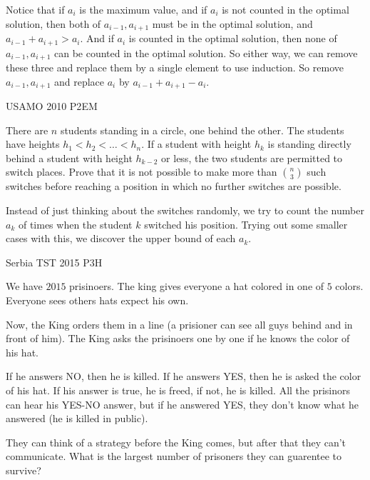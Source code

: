 \begin{solution}
    Notice that if $ a_i $ is the maximum value, and if $ a_i $ is not
    counted in the optimal solution, then both of $ a_{i-1}, a_{i+1} $ must be in
    the optimal solution, and $ a_{i-1} + a_{i+1} > a_i $. And if $ a_i $ is
    counted in the optimal solution, then none of $ a_{i-1}, a_{i+1} $ can be
    counted in the optimal solution. So either way, we can remove these three and
    replace them by a single element to use induction. So remove $ a_{i-1},
    a_{i+1} $ and replace $ a_i $ by $ a_{i-1} + a_{i+1} - a_i $.
\end{solution}


{USAMO 2010 P2}{EM}{
    There are $n$ students standing in a circle, one behind the other. The
    students have heights $h_1<h_2<\dots <h_n$. If a student with height $h_k$ is
    standing directly behind a student with height $h_{k-2}$ or less, the two
    students are permitted to switch places. Prove that it is not possible to make
    more than $\binom{n}{3}$ such switches before reaching a position in which no
    further switches are possible.

}

\begin{solution}
    Instead of just thinking about the switches randomly, we try to count the
    number $a_k$ of times when the student $k$ switched his position. Trying
    out some smaller cases with this, we discover the upper bound of each $a_k$.
\end{solution}


{Serbia TST 2015 P3}{H}{
    We have $2015$ prisinoers. The king gives everyone a hat colored
    in one of $5$ colors. Everyone sees others hats expect his own.

    Now, the King orders them in a line (a prisioner can see all guys behind
    and in front of him). The King asks the prisinoers one by one if he knows
    the color of his hat.

    If he answers NO, then he is killed. If he answers YES, then he is asked
    the color of his hat. If his answer is true, he is freed, if not, he is
    killed. All the prisinors can hear his YES-NO answer, but if he answered
    YES, they don't know what he answered (he is killed in public). 

    They can think of a strategy before the King comes, but after that they
    can't communicate. What is the largest number of prisoners they can guarentee
    to survive?

}

